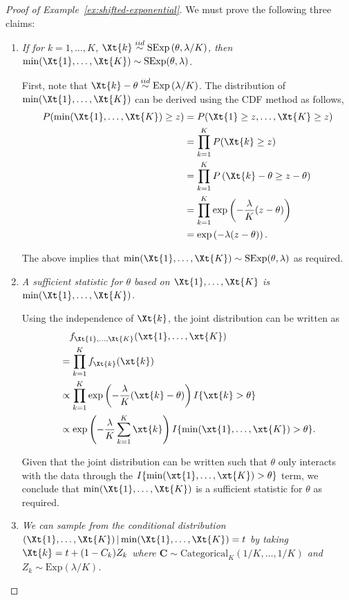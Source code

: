 \documentclass[12pt]{article}
\begin{document}
\begin{proof}[Proof of Example~\ref{ex:shifted-exponential}]
We must prove the following three claims:
\begin{enumerate}
    \item \emph{If for $k=1,\dots,K$, $\Xt{k} \overset{iid}{\sim} \text{SExp}\left(\theta,\lambda/K\right)$, then $\min(\Xt{1}, \dots,\Xt{K}) \sim \text{SExp}(\theta,\lambda)$.}  
    
First, note that $\Xt{k} - \theta \overset{iid}{\sim} \text{Exp}\left(\lambda/K\right)$. The distribution of $\min(\Xt{1},\dots,\Xt{K})$ can be derived using the CDF method as follows,
\begin{align*}
    P(\min(\Xt{1},\dots,\Xt{K})\ge z) &= P(\Xt{1} \ge z,\dots, \Xt{K} \ge z) \\
    &= \prod_{k=1}^K P(\Xt{k} \ge z) \\
    &= \prod_{k=1}^K P\left(\Xt{k}-\theta \ge z-\theta\right) \\
    &= \prod_{k=1}^K \exp\left(-\frac{\lambda}{K}(z-\theta)\right) \\
    &= \exp\left(-\lambda(z-\theta)\right).
\end{align*}

The above implies that $\min(\Xt{1},\dots,\Xt{K})\sim\text{SExp}(\theta,\lambda)$ as required.
    \item \emph{A sufficient statistic for $\theta$ based on $\Xt{1},\dots,\Xt{K}$ is $\min(\Xt{1},\dots,\Xt{K})$.} 

Using the independence of $\Xt{k}$, the joint distribution can be written as
\begin{align*} 
&\quad f_{\Xt{1},\dots,\Xt{K}}(\xt{1},\dots,\xt{K}) \\
&= \prod_{k=1}^K f_{\Xt{k}}(\xt{k}) \\
&\propto \prod_{k=1}^K \exp\left(-\frac{\lambda}{K}(\xt{k}-\theta)\right)I\{\xt{k}>\theta\} \\
&\propto \exp\left(-\frac{\lambda}{K}\sum_{k=1}^K\xt{k}\right)I\{\min(\xt{1},\dots,\xt{K})>\theta\}. 
\end{align*}

Given that the joint distribution can be written such that $\theta$ only interacts with the data through the $I\{\min(\xt{1},\dots,\xt{K})>\theta\}$ term, we conclude that $\min(\Xt{1},\dots,\Xt{K})$ is a sufficient statistic for $\theta$ as required.

    \item \emph{We can sample from the conditional distribution $\left(\Xt{1},\dots,\Xt{K}\right)|\min(\Xt{1},\dots,\Xt{K})=t$ by taking $\Xt{k}=t+(1-C_k)Z_k$ where $\mathbf{C} \sim \text{Categorical}_K(1/K,\dots,1/K)$ and $Z_k\sim\text{Exp}(\lambda/K)$.} 


\end{enumerate}
\end{proof}
\end{document}
